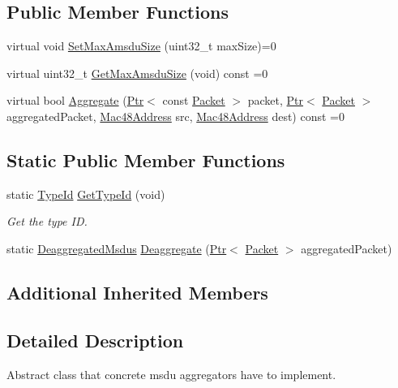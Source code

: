 \subsection*{Public Member Functions}
\begin{DoxyCompactItemize}
\item 
virtual void \hyperlink{classns3_1_1MsduAggregator_a8b2951e80cae44b42bf17bfc4ba81acd}{Set\+Max\+Amsdu\+Size} (uint32\+\_\+t max\+Size)=0
\item 
virtual uint32\+\_\+t \hyperlink{classns3_1_1MsduAggregator_ab1f0da0f2e5e6c6af6940ee90cd0f7ed}{Get\+Max\+Amsdu\+Size} (void) const =0
\item 
virtual bool \hyperlink{classns3_1_1MsduAggregator_a7eb8e17d5852eeb1d1499795a4696f19}{Aggregate} (\hyperlink{classns3_1_1Ptr}{Ptr}$<$ const \hyperlink{classns3_1_1Packet}{Packet} $>$ packet, \hyperlink{classns3_1_1Ptr}{Ptr}$<$ \hyperlink{classns3_1_1Packet}{Packet} $>$ aggregated\+Packet, \hyperlink{classns3_1_1Mac48Address}{Mac48\+Address} src, \hyperlink{classns3_1_1Mac48Address}{Mac48\+Address} dest) const =0
\end{DoxyCompactItemize}
\subsection*{Static Public Member Functions}
\begin{DoxyCompactItemize}
\item 
static \hyperlink{classns3_1_1TypeId}{Type\+Id} \hyperlink{classns3_1_1MsduAggregator_a53f915825ca321168464433fb37af9a1}{Get\+Type\+Id} (void)
\begin{DoxyCompactList}\small\item\em Get the type ID. \end{DoxyCompactList}\item 
static \hyperlink{classns3_1_1MsduAggregator_a9ca3d84483249fae3dffc35bcc98bb11}{Deaggregated\+Msdus} \hyperlink{classns3_1_1MsduAggregator_a5fbab40dc4a2b4b8ff94508ca7c988fc}{Deaggregate} (\hyperlink{classns3_1_1Ptr}{Ptr}$<$ \hyperlink{classns3_1_1Packet}{Packet} $>$ aggregated\+Packet)
\end{DoxyCompactItemize}
\subsection*{Additional Inherited Members}


\subsection{Detailed Description}
Abstract class that concrete msdu aggregators have to implement. 

